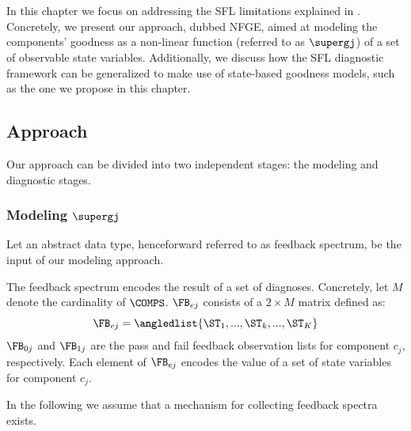 \renewcommand{\BrainFuckChapter}{
  {-}{[}{-}{-}{-}{>}{+}{<}{]}{>}{-}{-}{-}{-}{-}{-}{-}{.}{-}{-}{-}{-}{-}{-}{-}{-}{.}{+}{.}{-}{-}{.}{<}{>}{-}{+}{+}{-}{-}{<}{+}{<}{>}{-}{>}{<}{-}{>}{+}{-}{-}{>}{>}{+}{-}{>}{-}{+}{>}{+}{+}{+}{+}{+}{+}{>}{<}{-}{+}{<}
}
\renewcommand{\LifeChapter}{y}

\chapter{\NFGE}
\label{sec:nfge}
In this chapter we focus on addressing the \ac{SFL} limitations
explained in .
%
Concretely, we present our approach, dubbed \ac{NFGE}, aimed at
modeling the components' goodness as a non-linear function (referred
to as $\supergj$) of a set of observable state variables.
%
Additionally, we discuss how the \ac{SFL} diagnostic framework can be
generalized to make use of state-based goodness models, such as the
one we propose in this chapter.

\section{Approach}
\label{sec:nfge:approach}
Our approach can be divided into two independent stages: the modeling
and diagnostic stages.

\subsection{Modeling \texorpdfstring{$\supergj$}{gj(st)}}
\label{sec:nfge:approach:modeling}

Let an abstract data type, henceforward referred to as feedback
spectrum, be the input of our modeling approach.

\begin{definition}
  The feedback spectrum encodes the result of a set of diagnoses.
  Concretely, let $M$ denote the cardinality of $\COMPS$.
  $\FB_{ej}$ consists of a $2 \times M$ matrix defined as:
  \begin{equation}
    \label{eq:nfge:feedback-spectrum}
    \FB_{ej} = \angledlist{\ST_1, ...,  \ST_k, ..., \ST_K}
  \end{equation}
  $\FB_{0j}$ and $\FB_{1j}$ are the pass and fail feedback observation
  lists for component $c_j$, respectively.
  Each element of $\FB_{ej}$ encodes the value of a set of state
  variables for component $c_j$.
\end{definition}
\noindent
In the following we assume that a mechanism for collecting feedback
spectra exists.
%

